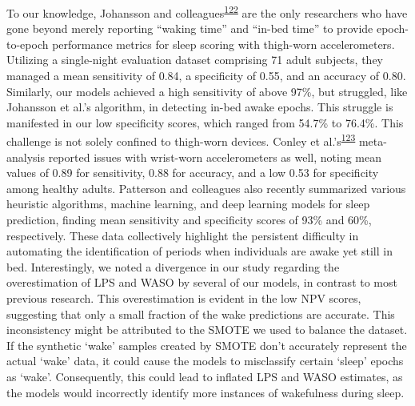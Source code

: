 \documentclass[
  9pt,
]{scrbook}
\begin{document}
To our knowledge, Johansson and
colleagues\textsuperscript{\protect\hyperlink{ref-johansson_development_2023}{122}}
are the only researchers who have gone beyond merely reporting ``waking
time'' and ``in-bed time'' to provide epoch-to-epoch performance metrics
for sleep scoring with thigh-worn accelerometers. Utilizing a
single-night evaluation dataset comprising 71 adult subjects, they
managed a mean sensitivity of 0.84, a specificity of 0.55, and an
accuracy of 0.80. Similarly, our models achieved a high sensitivity of
above 97\%, but struggled, like Johansson et al.'s algorithm, in
detecting in-bed awake epochs. This struggle is manifested in our low
specificity scores, which ranged from 54.7\% to 76.4\%. This challenge
is not solely confined to thigh-worn devices. Conley et
al.'s\textsuperscript{\protect\hyperlink{ref-conley_agreement_2019}{123}}
meta-analysis reported issues with wrist-worn accelerometers as well,
noting mean values of 0.89 for sensitivity, 0.88 for accuracy, and a low
0.53 for specificity among healthy adults. Patterson and colleagues also
recently summarized various heuristic algorithms, machine learning, and
deep learning models for sleep prediction, finding mean sensitivity and
specificity scores of 93\% and 60\%, respectively. These data
collectively highlight the persistent difficulty in automating the
identification of periods when individuals are awake yet still in bed.
Interestingly, we noted a divergence in our study regarding the
overestimation of LPS and WASO by several of our models, in contrast to
most previous research. This overestimation is evident in the low NPV
scores, suggesting that only a small fraction of the wake predictions
are accurate. This inconsistency might be attributed to the SMOTE we
used to balance the dataset. If the synthetic `wake' samples created by
SMOTE don't accurately represent the actual `wake' data, it could cause
the models to misclassify certain `sleep' epochs as `wake'.
Consequently, this could lead to inflated LPS and WASO estimates, as the
models would incorrectly identify more instances of wakefulness during
sleep.
\end{document}
